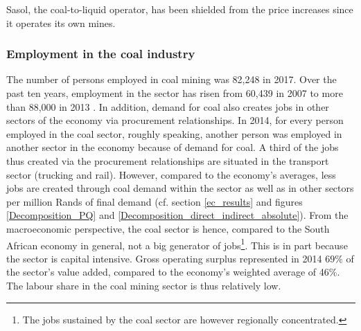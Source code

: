 \documentclass[12pt,english]{article}
\newcommand\lies[2][]{\todo[color=orange!50,#1]{ldf: #2}}
\begin{document}
Sasol, the coal-to-liquid operator, has been shielded from the price increases since it operates its own mines. %

\subsubsection{Employment in the coal industry}

The number of persons employed in coal mining was 82,248 in 2017.  Over the past ten years, employment in the sector has risen from 60,439 in 2007 to more than 88,000 in 2013 . In addition, demand for coal also creates jobs in other sectors of the economy via procurement relationships. In 2014, for every person employed in the coal sector, roughly speaking, another person was employed in another sector in the economy because of demand for coal. A third of the jobs thus created via the procurement relationships are situated in the transport sector (trucking and rail). However, compared to the economy's averages, less jobs are created through coal demand within the sector as well as in other sectors per million Rands of final demand (cf. section \ref{ec_results} and figures \ref{Decomposition_PQ} and \ref{Decomposition_direct_indirect_absolute}). %
From the macroeconomic perspective, the coal sector is hence, compared to the South African economy in general, not a big generator of jobs\footnote{The jobs sustained by the coal sector are however regionally concentrated.}. This is in part because the sector is capital intensive. Gross operating surplus represented in 2014 $69\%$ of the sector's value added, compared to the economy's weighted average of 46\%. The labour share in the coal mining sector is thus relatively low.
\end{document}

